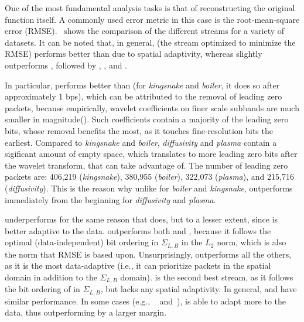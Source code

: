 One of the most fundamental analysis tasks is that of reconstructing the original function itself. A
commonly used error metric in this case is the root-mean-square error
(RMSE).~ shows the comparison of the different streams for a variety of
datasets. It can be noted that, in general, \srop (the stream optimized to minimize the RMSE)
performs better than \srsg due to spatial adaptivity, whereas \srsg slightly outperforms \swav,
followed by \sbit, \smag, and \slvl.

In particular, \sbit performs better than \slvl (for \emph{kingsnake} and \emph{boiler}, it does so
after approximately 1 bps), which can be attributed to the removal of leading zero packets, because
empirically, wavelet coefficients on finer scale subbands are much smaller in
magnitude(). Such coefficients contain a majority of the leading zero bits, whose removal
benefits \sbit the most, as it touches fine-resolution bits the earliest. Compared to
\emph{kingsnake} and \emph{boiler}, \emph{diffusivity} and \emph{plasma} contain a sigificant amount
of empty space, which translates to more leading zero bits after the wavelet transform, that \sbit
can take advantage of. The number of leading zero packets are: 406,219 (\emph{kingsnake}), 380,955
(\emph{boiler}), 322,073 (\emph{plasma}), and 215,716 (\emph{diffusivity}). This is the reason why
unlike for \emph{boiler} and \emph{kingsnake}, \sbit outperforms \slvl immediately from the
beginning for \emph{diffusivity} and \emph{plasma}. 

\smag underperforms for the same reason that \slvl does, but to a lesser extent, since \smag is
better adaptive to the data. \swav outperforms both \slvl and \sbit, because it follows the optimal
(data-independent) bit ordering in $\Sigma_{L,B}$ in the $L_2$ norm, which is also the norm that
RMSE is based upon. Unsurprisingly, \sopt outperforms all the others, as it is the most
data-adaptive (i.e., it can prioritize packets in the spatial domain in addition to the
$\Sigma_{L,B}$ domain). \ssig is the second best stream, as it follows the bit ordering of \sopt in
$\Sigma_{L,B}$, but lacks any spatial adaptivity. In general, \swav and \ssig have similar
performance. In some cases (e.g., ~ and~), \ssig is
able to adapt more to the data, thus outperforming \swav by a larger margin.

